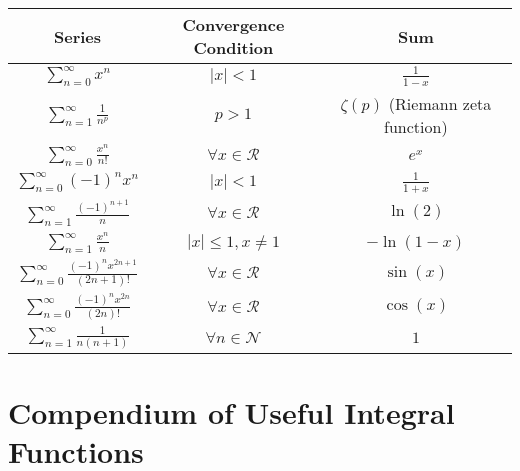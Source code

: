 \documentclass{article}
\begin{document}
\renewcommand{\arraystretch}{1.5}
\begin{center}
    \begin{tabular}{|c|c|c|}
        \hline
        \textbf{Series}                                       & \textbf{Convergence Condition} & \textbf{Sum}                       \\
        \hline
        $\sum_{n=0}^{\infty} x^n$                             & $|x| < 1$                      & $\frac{1}{1-x}$                    \\
        \hline
        $\sum_{n=1}^{\infty} \frac{1}{n^p}$                   & $p > 1$                        & $\zeta(p)$ (Riemann zeta function) \\
        \hline
        $\sum_{n=0}^{\infty} \frac{x^n}{n!}$                  & $\forall x \in \mathcal{R}$    & $e^x$                              \\
        \hline
        $\sum_{n=0}^{\infty} (-1)^n x^n$                      & $|x| < 1$                      & $\frac{1}{1+x}$                    \\
        \hline
        $\sum_{n=1}^{\infty} \frac{(-1)^{n+1}}{n}$            & $\forall x \in \mathcal{R}$    & $\ln(2)$                           \\
        \hline
        $\sum_{n=1}^{\infty} \frac{x^n}{n}$                   & $|x| \leq 1, x \neq 1$         & $-\ln(1-x)$                        \\
        \hline
        $\sum_{n=0}^{\infty} \frac{(-1)^n x^{2n+1}}{(2n+1)!}$ & $\forall x \in \mathcal{R}$    & $\sin(x)$                          \\
        \hline
        $\sum_{n=0}^{\infty} \frac{(-1)^n x^{2n}}{(2n)!}$     & $\forall x \in \mathcal{R}$    & $\cos(x)$                          \\
        \hline
        $\sum_{n=1}^{\infty} \frac{1}{n(n+1)}$                & $\forall n \in \mathcal{N}$    & $1$                                \\
        \hline
    \end{tabular}
\end{center}


\newpage

\section{Compendium of Useful Integral Functions}
\end{document}
